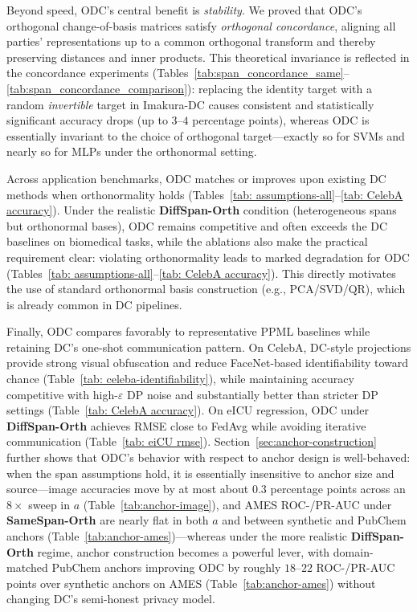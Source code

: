 \documentclass[final,3p,times]{elsarticle}
\theoremstyle{plain}
\begin{document}
Beyond speed, ODC’s central benefit is \emph{stability}. We proved that ODC’s orthogonal change-of-basis matrices satisfy \emph{orthogonal concordance}, aligning all parties’ representations up to a common orthogonal transform and thereby preserving distances and inner products. This theoretical invariance is reflected in the concordance experiments (Tables~\ref{tab:span_concordance_same}--\ref{tab:span_concordance_comparison}): replacing the identity target with a random \emph{invertible} target in Imakura-DC causes consistent and statistically significant accuracy drops (up to $3$--$4$ percentage points), whereas ODC is essentially invariant to the choice of orthogonal target---exactly so for SVMs and nearly so for MLPs under the orthonormal setting.

Across application benchmarks, ODC matches or improves upon existing DC methods when orthonormality holds (Tables~\ref{tab: assumptions-all}--\ref{tab: CelebA accuracy}). Under the realistic \textbf{DiffSpan-Orth} condition (heterogeneous spans but orthonormal bases), ODC remains competitive and often exceeds the DC baselines on biomedical tasks, while the ablations also make the practical requirement clear: violating orthonormality leads to marked degradation for ODC (Tables~\ref{tab: assumptions-all}--\ref{tab: CelebA accuracy}). This directly motivates the use of standard orthonormal basis construction (e.g., PCA/SVD/QR), which is already common in DC pipelines.

Finally, ODC compares favorably to representative PPML baselines while retaining DC’s one-shot communication pattern. On CelebA, DC-style projections provide strong visual obfuscation and reduce FaceNet-based identifiability toward chance (Table~\ref{tab: celeba-identifiability}), while maintaining accuracy competitive with high-$\varepsilon$ DP noise and substantially better than stricter DP settings (Table~\ref{tab: CelebA accuracy}). On eICU regression, ODC under \textbf{DiffSpan-Orth} achieves RMSE close to FedAvg while avoiding iterative communication (Table~\ref{tab: eiCU rmse}). Section~\ref{sec:anchor-construction} further shows that ODC’s behavior with respect to anchor design is well-behaved: when the span assumptions hold, it is essentially insensitive to anchor size and source---image accuracies move by at most about $0.3$ percentage points across an $8\times$ sweep in $a$ (Table~\ref{tab:anchor-image}), and AMES ROC-/PR-AUC under \textbf{SameSpan-Orth} are nearly flat in both $a$ and between synthetic and PubChem anchors (Table~\ref{tab:anchor-ames})---whereas under the more realistic \textbf{DiffSpan-Orth} regime, anchor construction becomes a powerful lever, with domain-matched PubChem anchors improving ODC by roughly $18$--$22$ ROC-/PR-AUC points over synthetic anchors on AMES (Table~\ref{tab:anchor-ames}) without changing DC’s semi-honest privacy model.
\end{document}
